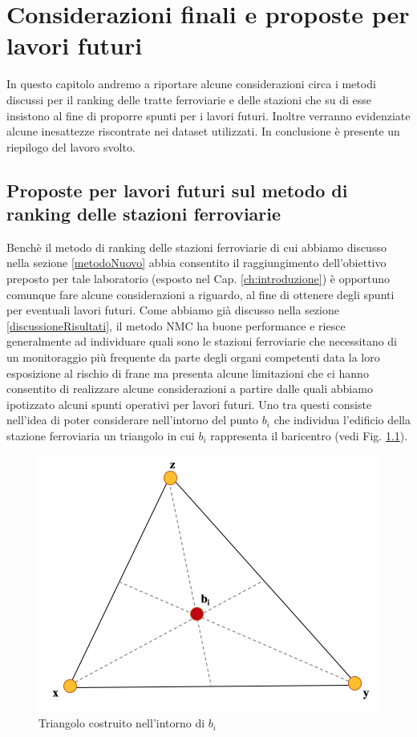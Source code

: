\chapter{Considerazioni finali e proposte per lavori futuri}
\label{ch:conclusionilavorifuturi}

In questo capitolo andremo a riportare alcune considerazioni circa i metodi discussi per il ranking delle tratte ferroviarie e delle stazioni che su di esse insistono al fine di proporre spunti per i lavori futuri. Inoltre verranno evidenziate alcune inesattezze riscontrate nei dataset utilizzati.
\newline
In conclusione è presente un riepilogo del lavoro svolto.
\section{Proposte per lavori futuri sul metodo di ranking delle stazioni ferroviarie}
Benchè il metodo di ranking delle stazioni ferroviarie di cui abbiamo discusso nella sezione \ref{metodoNuovo} abbia consentito il raggiungimento dell'obiettivo preposto per tale laboratorio (esposto nel Cap. \ref{ch:introduzione}) è opportuno comunque fare alcune considerazioni a riguardo, al fine di ottenere degli spunti per eventuali lavori futuri. Come abbiamo già discusso nella sezione \ref{discussioneRisultati}, il metodo NMC ha buone performance e riesce generalmente ad individuare quali sono le stazioni ferroviarie che necessitano di un monitoraggio più frequente da parte degli organi competenti data la loro esposizione al rischio di frane ma presenta alcune limitazioni che ci hanno consentito di realizzare alcune considerazioni a partire dalle quali abbiamo ipotizzato alcuni spunti operativi per lavori futuri. Uno tra questi consiste nell'idea di poter considerare nell'intorno del punto \textit{$b_i$} che individua l'edificio della stazione ferroviaria un triangolo in cui \textit{$b_i$} rappresenta il baricentro (vedi Fig. \ref{baricentro}).
\begin{figure}[hpt]
	\centering
	\includegraphics[width=0.5\linewidth]{img/baricentro}
	\caption{Triangolo costruito nell'intorno di \textit{$b_i$}}
	\label{baricentro}
\end{figure}

